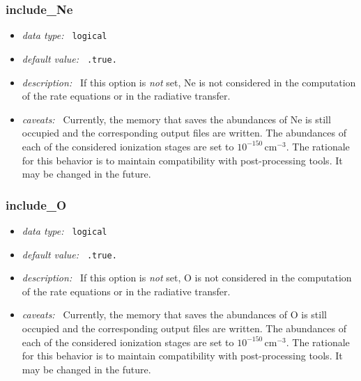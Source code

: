 \documentclass[a4paper,10pt]{article}
\begin{document}
\subsubsection{include\_Ne}
\label{opt:includene}
\begin{itemize}
 \item \textit{data type:~} \texttt{logical}
 \item \textit{default value:~} \texttt{.true.}
 \item \textit{description:~} If this option is 
 \textit{not} set, Ne is not considered 
 in the computation of the rate equations or in the
 radiative transfer. 
 \item \textit{caveats:~} Currently, the memory that saves the 
 abundances of Ne is still occupied and the corresponding output
 files are written. The abundances of each of the considered ionization
 stages are set to $10^{-150}\,\mathrm{cm^{-3}}$. The rationale for
 this behavior is to maintain compatibility with post-processing
 tools. It may be changed in the future.
\end{itemize}


\subsubsection{include\_O}
\label{opt:includeo}
\begin{itemize}
 \item \textit{data type:~} \texttt{logical}
 \item \textit{default value:~} \texttt{.true.}
 \item \textit{description:~} If this option is 
 \textit{not} set, O is not considered 
 in the computation of the rate equations or in the
 radiative transfer. 
 \item \textit{caveats:~} Currently, the memory that saves the 
 abundances of O is still occupied and the corresponding output
 files are written. The abundances of each of the considered ionization
 stages are set to $10^{-150}\,\mathrm{cm^{-3}}$. The rationale for
 this behavior is to maintain compatibility with post-processing
 tools. It may be changed in the future.
\end{itemize}
\end{document}
